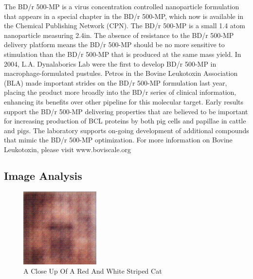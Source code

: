 \documentclass{article}%
\begin{document}
The BD/r 500{-}MP is a virus concentration controlled nanoparticle formulation that appears in a special chapter in the BD/r 500{-}MP, which now is available in the Chemical Publishing Network (CPN). The BD/r 500{-}MP is a small 1.4 atom nanoparticle measuring 2.4in. The absence of resistance to the BD/r 500{-}MP delivery platform means the BD/r 500{-}MP should be no more sensitive to stimulation than the BD/r 500{-}MP that is produced at the same mass yield. In 2004, L.A. Dynalaborics Lab were the first to develop BD/r 500{-}MP in macrophage{-}formulated pustules. Petros in the Bovine Leukotoxin Association (BLA) made important strides on the BD/r 500{-}MP formulation last year, placing the product more broadly into the BD/r series of clinical information, enhancing its benefits over other pipeline for this molecular target. Early results support the BD/r 500{-}MP delivering properties that are believed to be important for increasing production of BCL proteins by both pig cells and papillae in cattle and pigs. The laboratory supports on{-}going development of additional compounds that mimic the BD/r 500{-}MP optimization.\newline%
For more information on Bovine Leukotoxin, please visit www.boviscale.org

%
\subsection{Image Analysis}%
\label{subsec:ImageAnalysis}%


\begin{figure}[h!]%
\centering%
\includegraphics[width=150px]{500_fake_images/samples_5_339.png}%
\caption{A Close Up Of A Red And White Striped Cat}%
\end{figure}

%
\end{document}
